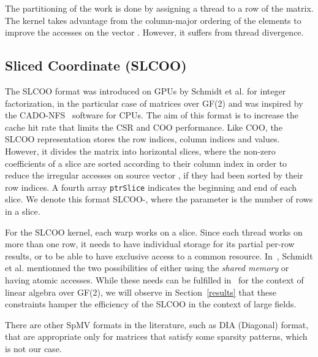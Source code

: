 \documentclass[runningheads,orivec]{llncs}
\begin{document}
The partitioning of the work is done by assigning a thread to a row of the matrix. The kernel takes advantage from the column-major ordering of the elements to improve the accesses on the vector . However, it suffers from thread divergence. 


\vspace*{-0.25cm}

\subsection*{Sliced Coordinate (SLCOO)}
\vspace*{-0.25cm}

The SLCOO format was introduced on GPUs by Schmidt et al. for integer factorization, in the particular case of matrices over GF(2) \cite{SHMI11} and was inspired by the CADO-NFS~\cite{CADO} software for CPUs. The aim of this format is to increase the cache hit rate that limits the CSR and COO performance. 
Like COO, the SLCOO representation stores the row indices, column indices and values. However, it divides the matrix into horizontal slices, where the non-zero coefficients of a slice are sorted according to their column index in order to reduce the irregular accesses on source vector , if they had been sorted by their row indices. A fourth array \texttt{ptrSlice} indicates the beginning and end of each slice. We denote this format SLCOO-, where the parameter  is the number of rows in a slice.






For the SLCOO kernel, each warp works on a slice. Since each thread works on more than one row, it needs to have individual storage for its partial per-row results, or to be able to have exclusive access to a common resource. In~\cite{SHMI11}, Schmidt et al. mentionned the two possibilities of either using the \textit{shared memory} or having atomic accesses. While these needs can be fulfilled in~\cite{SHMI11} for the context of linear algebra over GF(2), we will observe in Section~\ref{results} that these constraints hamper the efficiency of the SLCOO in the context of large fields.





\medskip
There are other SpMV formats in the literature, such as DIA (Diagonal) format, that are appropriate only for matrices that satisfy some sparsity patterns, which is not our case.

\vspace*{-0.25cm}
\end{document}
